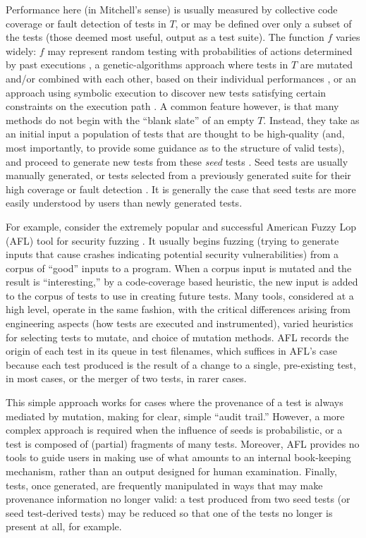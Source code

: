 \documentclass[final]{article}
\begin{document}
Performance here (in Mitchell's sense) is usually measured by
collective code coverage or fault detection of tests in $T$, or may be
defined over only a subset of the tests (those deemed most useful,
output as a test suite).  The function $f$ varies widely: $f$ may
represent random testing with probabilities of actions determined by
past executions \cite{AndrewsL07}, a genetic-algorithms approach where
tests in $T$ are mutated and/or combined with each other, based on
their individual performances
\cite{McMinn04search-basedsoftware,FA11,aflfuzz}, or an approach using
symbolic execution to discover new tests satisfying certain
constraints on the execution path \cite{Whitebox,GodefroidKS05,KLEE}.
A common feature however, is that many methods do not begin with the
``blank slate'' of an empty $T$.  Instead, they take as an initial
input a population of tests that are thought to be high-quality (and,
most importantly, to provide some guidance as to the structure of
valid tests), and proceed to generate new tests from these \emph{seed}
tests
\cite{aflfuzz,Person:2011:DIS:1993498.1993558,Marinescu:2012:MTS:2337223.2337308,issta14,STVR_seeding}.
Seed tests are usually manually generated, or tests selected from a
previously generated suite for their high coverage or fault detection
\cite{YooHarman,stvrcausereduce}.  It is generally the case that seed
tests are more easily understood by users than newly generated tests.

For example, consider the extremely popular and successful American
Fuzzy Lop (AFL) tool
for security fuzzing \cite{aflfuzz}.  It usually begins fuzzing
(trying to generate inputs that cause crashes indicating potential
security vulnerabilities) from a corpus of ``good'' inputs to a
program.  When a corpus input is mutated and the result is
``interesting,'' by a code-coverage based heuristic, the new input is
added to the corpus of tests to use in creating future tests.  Many
tools, considered at a high level, operate in the same fashion, with the
critical differences arising from engineering aspects (how tests are executed
and instrumented), varied heuristics for selecting tests to mutate,
and choice of mutation methods.  AFL records the origin of each test
in its queue in test filenames, which suffices in AFL's case because
each test produced is the result of a change to a single, pre-existing
test, in most cases, or the merger of two tests, in rarer cases.

This simple approach works for cases where the provenance of a test is
always mediated by mutation, making for clear, simple ``audit trail.''  However, a more complex approach is
required when the influence of seeds is probabilistic, or a test is
composed of (partial) fragments of many tests.  Moreover, AFL provides
no tools to guide users in making use of what amounts to an internal
book-keeping mechanism, rather than an output designed for human
examination.
Finally, tests, once generated, are frequently manipulated in ways
that may make provenance information no longer valid:  a test produced
from two seed tests (or seed test-derived tests) may be reduced
\cite{DD} so that one of the tests no longer is present at all, for example.
\end{document}
